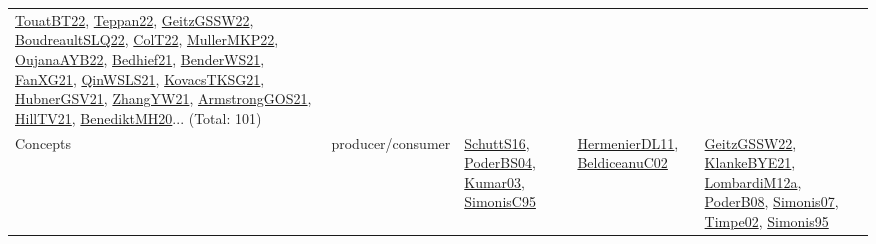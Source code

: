 {\begin{longtable}{lp{3cm}>{\raggedright}p{6cm}>{\raggedright}p{6cm}p{8cm}}
\href{papers/TouatBT22.pdf}{TouatBT22}\cite{TouatBT22}, \href{papers/Teppan22.pdf}{Teppan22}\cite{Teppan22}, \href{papers/GeitzGSSW22.pdf}{GeitzGSSW22}\cite{GeitzGSSW22}, \href{papers/BoudreaultSLQ22.pdf}{BoudreaultSLQ22}\cite{BoudreaultSLQ22}, \href{articles/ColT22.pdf}{ColT22}\cite{ColT22}, \href{articles/MullerMKP22.pdf}{MullerMKP22}\cite{MullerMKP22}, \href{papers/OujanaAYB22.pdf}{OujanaAYB22}\cite{OujanaAYB22}, \href{articles/Bedhief21.pdf}{Bedhief21}\cite{Bedhief21}, \href{papers/BenderWS21.pdf}{BenderWS21}\cite{BenderWS21}, \href{articles/FanXG21.pdf}{FanXG21}\cite{FanXG21}, \href{articles/QinWSLS21.pdf}{QinWSLS21}\cite{QinWSLS21}, \href{papers/KovacsTKSG21.pdf}{KovacsTKSG21}\cite{KovacsTKSG21}, \href{articles/HubnerGSV21.pdf}{HubnerGSV21}\cite{HubnerGSV21}, \href{articles/ZhangYW21.pdf}{ZhangYW21}\cite{ZhangYW21}, \href{papers/ArmstrongGOS21.pdf}{ArmstrongGOS21}\cite{ArmstrongGOS21}, \href{papers/HillTV21.pdf}{HillTV21}\cite{HillTV21}, \href{articles/BenediktMH20.pdf}{BenediktMH20}\cite{BenediktMH20}... (Total: 101)\\
Concepts & producer/consumer & \href{papers/SchuttS16.pdf}{SchuttS16}\cite{SchuttS16}, \href{articles/PoderBS04.pdf}{PoderBS04}\cite{PoderBS04}, \href{papers/Kumar03.pdf}{Kumar03}\cite{Kumar03}, \href{papers/SimonisC95.pdf}{SimonisC95}\cite{SimonisC95} & \href{papers/HermenierDL11.pdf}{HermenierDL11}\cite{HermenierDL11}, \href{papers/BeldiceanuC02.pdf}{BeldiceanuC02}\cite{BeldiceanuC02} & \href{papers/GeitzGSSW22.pdf}{GeitzGSSW22}\cite{GeitzGSSW22}, \href{papers/KlankeBYE21.pdf}{KlankeBYE21}\cite{KlankeBYE21}, \href{articles/LombardiM12a.pdf}{LombardiM12a}\cite{LombardiM12a}, \href{papers/PoderB08.pdf}{PoderB08}\cite{PoderB08}, \href{articles/Simonis07.pdf}{Simonis07}\cite{Simonis07}, \href{articles/Timpe02.pdf}{Timpe02}\cite{Timpe02}, \href{papers/Simonis95.pdf}{Simonis95}\cite{Simonis95}\\

\end{longtable}}
